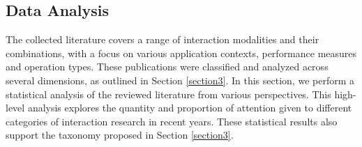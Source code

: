 \documentclass[review]{fcs}
\begin{document}
\subsection{Data Analysis} %

The collected literature covers a range of interaction modalities and their combinations, with a focus on various application contexts, performance measures and operation types. These publications were classified and analyzed across several dimensions, as outlined in Section \ref{section3}. 
In this section, we perform a statistical analysis of the reviewed literature from various perspectives. This high-level analysis explores the quantity and proportion of attention given to different categories of interaction research in recent years. These statistical results also support the taxonomy proposed in Section \ref{section3}.

\end{document}
